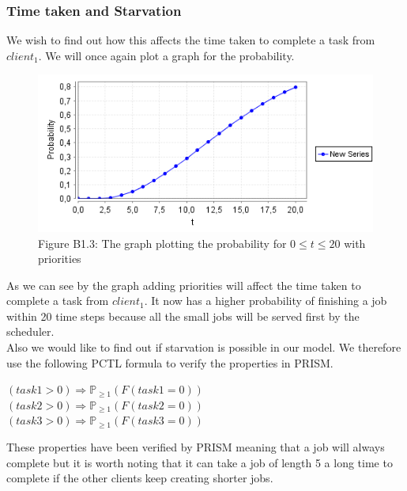 \documentclass[12pt]{report}
\begin{document}
\subsubsection*{Time taken and Starvation}
We wish to find out how this affects the time taken to complete a task from $client_1$. We will once again plot a graph for the probability.
\begin{figure}[H]
	\centering
	\includegraphics[scale=0.75]{../GFX/B1-2b.png}\\
	Figure B1.3: The graph plotting the probability for $0 \leq t \leq 20$ with priorities
\end{figure}
As we can see by the graph adding priorities will affect the time taken to complete a task from $client_1$. It now has a higher probability of finishing a job within 20 time steps because all the small jobs will be served first by the scheduler.
\\Also we would like to find out if starvation is possible in our model. We therefore use the following PCTL formula to verify the properties in PRISM.
\begin{center}
$(task1 > 0) \Rightarrow \mathbb{P}_{\geq 1}(F(task1 = 0))$\\
$(task2 > 0) \Rightarrow \mathbb{P}_{\geq 1}(F(task2 = 0))$\\
$(task3 > 0) \Rightarrow \mathbb{P}_{\geq 1} (F(task3 = 0))$
\end{center}
These properties have been verified by PRISM meaning that a job will always complete but it is worth noting that it can take a job of length 5 a long time to complete if the other clients keep creating shorter jobs.
\end{document}
